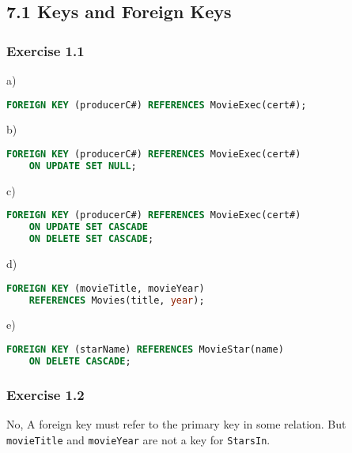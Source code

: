 \documentclass[../../main.tex]{subfiles}
\begin{document}
\subsection{7.1 Keys and Foreign Keys}

\subsubsection*{Exercise 1.1}

a)

\begin{lstlisting}[language=sql]
  FOREIGN KEY (producerC#) REFERENCES MovieExec(cert#);
\end{lstlisting}

b)

\begin{lstlisting}[language=sql]
  FOREIGN KEY (producerC#) REFERENCES MovieExec(cert#)
    ON UPDATE SET NULL;
\end{lstlisting}

c)

\begin{lstlisting}[language=sql]
  FOREIGN KEY (producerC#) REFERENCES MovieExec(cert#)
    ON UPDATE SET CASCADE
    ON DELETE SET CASCADE;
\end{lstlisting}

d)

\begin{lstlisting}[language=sql]
  FOREIGN KEY (movieTitle, movieYear)
    REFERENCES Movies(title, year);
\end{lstlisting}

e)

\begin{lstlisting}[language=sql]
  FOREIGN KEY (starName) REFERENCES MovieStar(name)
    ON DELETE CASCADE;
\end{lstlisting}

\subsubsection*{Exercise 1.2}

No, A foreign key must refer to the primary key in some
relation. But \verb|movieTitle| and \verb|movieYear|
are not a key for \verb|StarsIn|.
\end{document}
